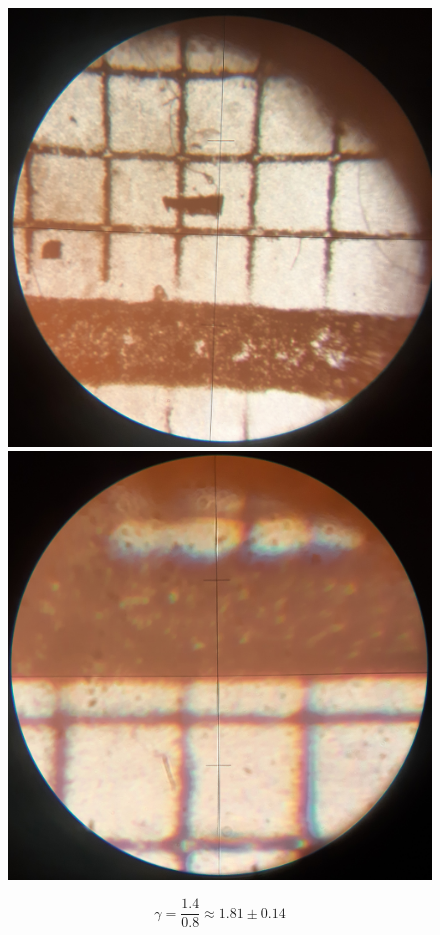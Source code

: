 \documentclass[14pt, a4paper]{report}
\begin{document}
\begin{enumerate}
\begin{figure}[H]
\centering
\begin{minipage}{.5\textwidth}
  \centering
  \includegraphics[width=.85\linewidth]{../images/411_1}
\end{minipage}%
\begin{minipage}{.5\textwidth}
  \centering
  \includegraphics[width=.85\linewidth]{../images/411_2}
\end{minipage}
\end{figure}

\[\gamma=\frac{1.4}{0.8}\approx1.81\pm0.14\]

\end{enumerate}
\end{document}
